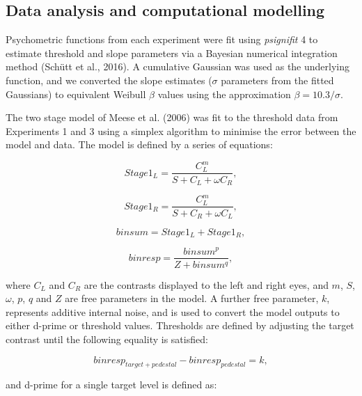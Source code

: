 \documentclass[
]{article}
\begin{document}
\hypertarget{data-analysis-and-computational-modelling}{%
\subsection{Data analysis and computational modelling}\label{data-analysis-and-computational-modelling}}

Psychometric functions from each experiment were fit using \emph{psignifit} 4 to estimate threshold and slope parameters via a Bayesian numerical integration method (Schütt et al., 2016). A cumulative Gaussian was used as the underlying function, and we converted the slope estimates (\(\sigma\) parameters from the fitted Gaussians) to equivalent Weibull \(\beta\) values using the approximation \(\beta = 10.3/\sigma\).

The two stage model of Meese et al. (2006) was fit to the threshold data from Experiments 1 and 3 using a simplex algorithm to minimise the error between the model and data. The model is defined by a series of equations:

\begin{equation}
Stage1_L = \frac{C_L^m}{S + C_L + \omega C_R},
\end{equation}

\begin{equation}
Stage1_R = \frac{C_L^m}{S + C_R + \omega C_L},
\end{equation}

\begin{equation}
binsum = Stage1_L + Stage1_R,
\end{equation}

\begin{equation}
binresp = \frac{binsum^p}{Z + binsum^q},
\end{equation}

where \(C_L\) and \(C_R\) are the contrasts displayed to the left and right eyes, and \(m\), \(S\), \(\omega\), \(p\), \(q\) and \(Z\) are free parameters in the model. A further free parameter, \(k\), represents additive internal noise, and is used to convert the model outputs to either d-prime or threshold values. Thresholds are defined by adjusting the target contrast until the following equality is satisfied:

\begin{equation}
binresp_{target+pedestal} - binresp_{pedestal} = k,
\end{equation}

and d-prime for a single target level is defined as:
\end{document}
